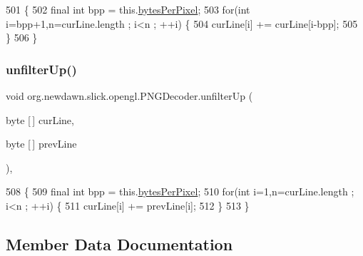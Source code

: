 \begin{DoxyCode}
501                                              \{
502         \textcolor{keyword}{final} \textcolor{keywordtype}{int} bpp = this.\mbox{\hyperlink{classorg_1_1newdawn_1_1slick_1_1opengl_1_1_p_n_g_decoder_aa7dcf351689be9279548b306395ee1a8}{bytesPerPixel}};
503         \textcolor{keywordflow}{for}(\textcolor{keywordtype}{int} i=bpp+1,n=curLine.length ; i<n ; ++i) \{
504             curLine[i] += curLine[i-bpp];
505         \}
506     \}
\end{DoxyCode}
\mbox{\label{classorg_1_1newdawn_1_1slick_1_1opengl_1_1_p_n_g_decoder_a5d759acd42a8f0e0569c534c1a9bcf55}} 
\subsubsection{\texorpdfstring{unfilter\+Up()}{unfilterUp()}}
{\footnotesize\ttfamily void org.\+newdawn.\+slick.\+opengl.\+P\+N\+G\+Decoder.\+unfilter\+Up (\begin{DoxyParamCaption}\item[{byte \mbox{[}$\,$\mbox{]}}]{cur\+Line,  }\item[{byte \mbox{[}$\,$\mbox{]}}]{prev\+Line }\end{DoxyParamCaption})\hspace{0.3cm}{\ttfamily [inline]}, {\ttfamily [private]}}


\begin{DoxyCode}
508                                                              \{
509         \textcolor{keyword}{final} \textcolor{keywordtype}{int} bpp = this.\mbox{\hyperlink{classorg_1_1newdawn_1_1slick_1_1opengl_1_1_p_n_g_decoder_aa7dcf351689be9279548b306395ee1a8}{bytesPerPixel}};
510         \textcolor{keywordflow}{for}(\textcolor{keywordtype}{int} i=1,n=curLine.length ; i<n ; ++i) \{
511             curLine[i] += prevLine[i];
512         \}
513     \}
\end{DoxyCode}


\subsection{Member Data Documentation}
\mbox{\label{classorg_1_1newdawn_1_1slick_1_1opengl_1_1_p_n_g_decoder_a3df8efe1a627d4c86526e3d74d13e350}} 
